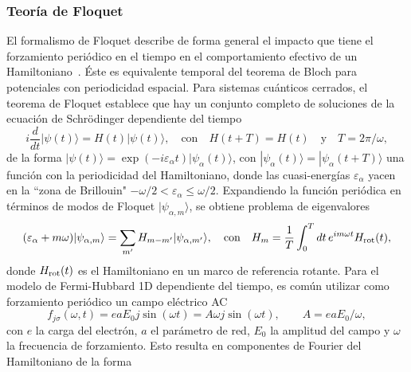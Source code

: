 \documentclass[a4paper,10pt]{article}
\begin{document}
\subsubsection{Teor\'ia de Floquet} \label{sec_floquet}
El formalismo de Floquet describe de forma general el impacto que tiene el forzamiento peri\'odico en el tiempo en el comportamiento efectivo de un Hamiltoniano~\cite{bukov2015adv}. \'Este es equivalente temporal del teorema de Bloch para potenciales con periodicidad espacial. Para sistemas cu\'anticos cerrados, el teorema de Floquet establece que hay un conjunto completo de soluciones de la ecuaci\'on de Schr\"odinger dependiente del tiempo
\begin{equation} \label{schrodinger}
i\frac{d}{dt}|\psi(t)\rangle=H(t)|\psi(t)\rangle,\quad\text{con}\quad H(t+T)=H(t)\quad\text{y}\quad T=2\pi/\omega,
\end{equation}
de la forma $|\psi(t)\rangle=\exp(-i\varepsilon_{\alpha}t)|\psi_{\alpha}(t)\rangle$, con $|\psi_{\alpha}(t)\rangle=|\psi_{\alpha}(t+T)\rangle$ una funci\'on con la periodicidad del Hamiltoniano,
donde las cuasi-energ\'ias $\varepsilon_{\alpha}$ yacen en la ``zona de Brillouin" $-\omega/2<\varepsilon_{\alpha}\leq\omega/2$. Expandiendo la funci\'on peri\'odica
en t\'erminos de modos de Floquet $|\psi_{\alpha,m}\rangle$, se obtiene problema de eigenvalores
\begin{equation} \label{eigenvalue_problem}
(\varepsilon_{\alpha}+m\omega)|\psi_{\alpha,m}\rangle=\sum_{m'}H_{m-m'}|\psi_{\alpha,m'}\rangle,\quad\text{con}\quad H_m=\frac{1}{T}\int_0^Tdt\,e^{im\omega t}H_{\rm rot}(t),
\end{equation}
donde $H_{\rm rot}(t)$ es el Hamiltoniano en un marco de referencia rotante. Para el modelo de Fermi-Hubbard 1D dependiente del tiempo, es com\'un utilizar como forzamiento peri\'odico un campo el\'ectrico AC~\cite{tsuji2011prl,mentink2015nat}
\begin{equation} \label{field_ac}
f_{j\sigma}(\omega,t)=eaE_0j\sin(\omega t)=A\omega j\sin(\omega t),\qquad A = eaE_0/\omega, 
\end{equation}
con $e$ la carga del electr\'on, $a$ el par\'ametro de red, $E_0$ la amplitud del campo y $\omega$ la frecuencia de forzamiento. Esto resulta en componentes de Fourier del Hamiltoniano de la forma 
\end{document}
